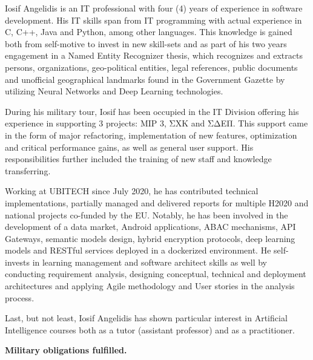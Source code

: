 \par{
Iosif Angelidis is an IT professional with four (4) years of experience in software development. His IT skills span from IT programming with actual experience in C, C++, Java and Python, among other languages. This knowledge is gained both from self-motive to invest in new skill-sets and as part of his two years engagement in a Named Entity Recognizer thesis, which recognizes and extracts persons, organizations, geo-political entities, legal references, public documents and unofficial geographical landmarks found in the Government Gazette by utilizing Neural Networks and Deep Learning technologies.}

\par{During his military tour, Iosif has been occupied in the IT Division offering his experience in supporting 3 projects: MIP 3, ΣΧΚ and ΣΔΕΠ. This support came in the form of major refactoring, implementation of new features, optimization and critical performance gains, as well as general user support. His responsibilities further included the training of new staff and knowledge transferring.}

\par{Working at UBITECH since July 2020, he has contributed technical implementations, partially managed and delivered reports for multiple H2020 and national projects co-funded by the EU. Notably, he has been involved in the development of a data market, Android applications, ABAC mechanisms, API Gateways, semantic models design, hybrid encryption protocols, deep learning models and RESTful services deployed in a dockerized environment. He self-invests in learning management and software architect skills as well by conducting requirement analysis, designing conceptual, technical and deployment architectures and applying Agile methodology and User stories in the analysis process.}

\par{Last, but not least, Iosif Angelidis has shown particular interest in Artificial Intelligence courses both as a tutor (assistant professor) and as a practitioner.}

\par{\textbf{Military obligations fulfilled.} }

